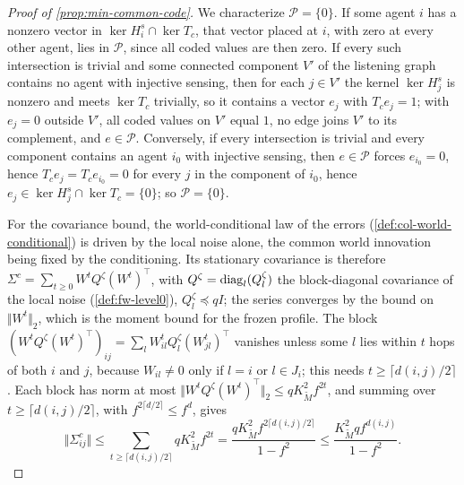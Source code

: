 \begin{proof}[Proof of \cref{prop:min-common-code}]
We characterize $\mathcal P=\{0\}$. If some agent $i$ has a nonzero vector in $\ker H^s_i\cap\ker T_c$, that vector placed at $i$, with zero at every other agent, lies in $\mathcal P$, since all coded values are then zero. If every such intersection is trivial and some connected component $V'$ of the listening graph contains no agent with injective sensing, then for each $j\in V'$ the kernel $\ker H^s_j$ is nonzero and meets $\ker T_c$ trivially, so it contains a vector $e_j$ with $T_ce_j=1$; with $e_j=0$ outside $V'$, all coded values on $V'$ equal $1$, no edge joins $V'$ to its complement, and $e\in\mathcal P$. Conversely, if every intersection is trivial and every component contains an agent $i_0$ with injective sensing, then $e\in\mathcal P$ forces $e_{i_0}=0$, hence $T_ce_j=T_ce_{i_0}=0$ for every $j$ in the component of $i_0$, hence $e_j\in\ker H^s_j\cap\ker T_c=\{0\}$; so $\mathcal P=\{0\}$.

For the covariance bound, the world-conditional law of the errors (\cref{def:col-world-conditional}) is driven by the local noise alone, the common world innovation being fixed by the conditioning. Its stationary covariance is therefore $\Sigma^c=\sum_{t\ge0}W^tQ^\zeta(W^t)^\top$, with $Q^\zeta=\operatorname{diag}_l(Q^\zeta_l)$ the block-diagonal covariance of the local noise (\cref{def:fw-level0}), $Q^\zeta_l\preceq qI$; the series converges by the bound on $\Vert W^t\Vert_2$, which is the moment bound for the frozen profile. The block $(W^tQ^\zeta(W^t)^\top)_{ij}=\sum_lW^t_{il}Q^\zeta_l(W^t_{jl})^\top$ vanishes unless some $l$ lies within $t$ hops of both $i$ and $j$, because $W_{il}\neq0$ only if $l=i$ or $l\in J_i$; this needs $t\ge\lceil d(i,j)/2\rceil$. Each block has norm at most $\Vert W^tQ^\zeta(W^t)^\top\Vert_2\le qK_{\tilde M}^2f^{2t}$, and summing over $t\ge\lceil d(i,j)/2\rceil$, with $f^{2\lceil d/2\rceil}\le f^{d}$, gives
\[
\Vert\Sigma^c_{ij}\Vert\le\sum_{t\ge\lceil d(i,j)/2\rceil}qK_{\tilde M}^2f^{2t}=\frac{qK_{\tilde M}^2f^{2\lceil d(i,j)/2\rceil}}{1-f^2}\le\frac{K_{\tilde M}^2qf^{d(i,j)}}{1-f^2}.
\]


\end{proof}
